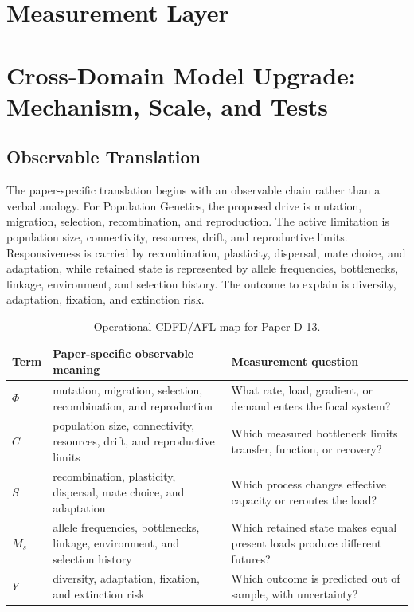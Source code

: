 \documentclass[11pt,a4paper]{article}
\begin{document}
\section{Measurement Layer}

\section{Cross-Domain Model Upgrade: Mechanism, Scale, and Tests}

\subsection{Observable Translation}

The paper-specific translation begins with an observable chain rather than a
verbal analogy. For Population Genetics, the proposed drive is mutation, migration, selection, recombination, and reproduction.
The active limitation is population size, connectivity, resources, drift, and reproductive limits. Responsiveness is carried by
recombination, plasticity, dispersal, mate choice, and adaptation, while retained state is represented by
allele frequencies, bottlenecks, linkage, environment, and selection history. The outcome to explain is diversity, adaptation, fixation, and extinction risk.

\begin{table}[htbp]
\centering
\small
\caption{Operational CDFD/AFL map for Paper D-13.}
\begin{tabularx}{\textwidth}{|l|X|X|}
\hline
\textbf{Term} & \textbf{Paper-specific observable meaning} & \textbf{Measurement question} \\
\hline
$\Phi$ & mutation, migration, selection, recombination, and reproduction & What rate, load, gradient, or demand enters the focal system? \\
\hline
$C$ & population size, connectivity, resources, drift, and reproductive limits & Which measured bottleneck limits transfer, function, or recovery? \\
\hline
$S$ & recombination, plasticity, dispersal, mate choice, and adaptation & Which process changes effective capacity or reroutes the load? \\
\hline
$M_s$ & allele frequencies, bottlenecks, linkage, environment, and selection history & Which retained state makes equal present loads produce different futures? \\
\hline
$Y$ & diversity, adaptation, fixation, and extinction risk & Which outcome is predicted out of sample, with uncertainty? \\
\hline
\end{tabularx}
\end{table}
\end{document}
